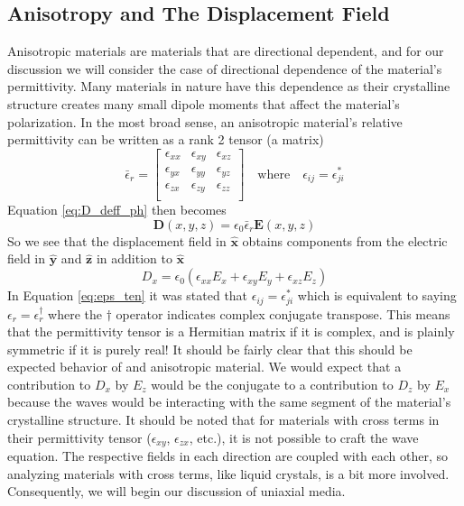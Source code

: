 \documentclass{optica-article}
\newcommand{\bv}[1]{\mathbf{#1}}
\begin{document}
\subsection{Anisotropy and The Displacement Field}
Anisotropic materials are materials that are directional dependent, and for 
our discussion we will consider the case of directional dependence of the 
material's permittivity. Many materials in nature have this dependence as
their crystalline structure creates many small dipole moments that affect the
material's polarization. In the most broad sense, an anisotropic material's
relative permittivity can be written as a rank 2 tensor (a matrix) 
\cite{Balanis-2012,CWA_S,Wav_anis}
\begin{equation}\label{eq:eps_ten}
  \bar{\epsilon}_r = \begin{bmatrix}
      \epsilon_{xx} & \epsilon_{xy} & \epsilon_{xz}\\
      \epsilon_{yx} & \epsilon_{yy} & \epsilon_{yz}\\
      \epsilon_{zx} & \epsilon_{zy} & \epsilon_{zz}\\
  \end{bmatrix}
  \quad\text{where}\quad
  \epsilon_{ij} = \epsilon_{ji}^*
\end{equation}
Equation \eqref{eq:D_deff_ph} then becomes
\begin{equation}\label{eq:D_anis}
  \bv{D}(x,y,z) =  \epsilon_0\bar{\epsilon}_r \bv{E}(x,y,z)
\end{equation}
So we see that the displacement field in $\bv{\hat{x}}$ obtains components
from the electric field in $\bv{\hat{y}}$ and $\bv{\hat{z}}$ in addition
to $\bv{\hat{x}}$
\begin{equation}
D_x= \epsilon_0\left(\epsilon_{xx}E_x + \epsilon_{xy}E_y + 
\epsilon_{xz}E_z\right)
\end{equation}
In Equation \eqref{eq:eps_ten} it was stated that $\epsilon_{ij} = 
\epsilon_{ji}^*$ which is equivalent to saying $\epsilon_r = \epsilon_r^\dagger$
where the $\dagger$ operator indicates complex conjugate transpose. This means
that the permittivity tensor is a Hermitian matrix if it is complex, 
and is plainly symmetric if it is purely real! It should be fairly clear 
that this should be expected behavior of and anisotropic material. We would 
expect that a contribution to $D_x$ by $E_z$ would be the conjugate to a 
contribution to $D_z$ by $E_x$ because the waves would be interacting with the
same segment of the material's crystalline structure. It should be noted that 
for materials with cross terms in their permittivity tensor ($\epsilon_{xy}$, 
$\epsilon_{zx}$, etc.), it is not possible to craft the wave equation.
The respective fields in each direction are coupled with each other, so 
analyzing materials with cross terms, like liquid crystals, is a bit more
involved. Consequently, we will begin our discussion of uniaxial media.
\end{document}
